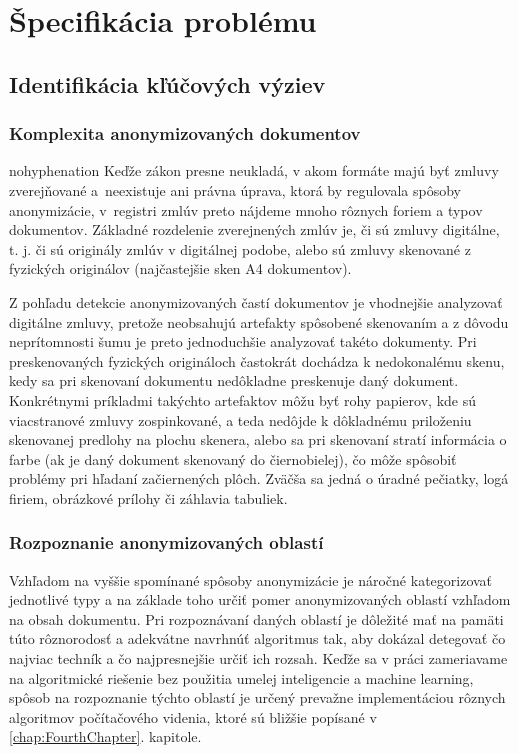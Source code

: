 \chapter{Špecifikácia problému}
\label{chap:SecondChapter}
\section{Identifikácia kľúčových výziev}
\subsection{Komplexita anonymizovaných dokumentov}
\begin{hyphenrules}{nohyphenation}
Keďže zákon \cite{ZakonyProLidi2015-340} presne neukladá, v akom formáte majú byť zmluvy zverejňované a~neexistuje ani právna úprava, ktorá by regulovala spôsoby anonymizácie, v~registri zmlúv preto nájdeme mnoho rôznych foriem a typov dokumentov.
Základné rozdelenie zverejnených zmlúv je, či sú zmluvy digitálne, t. j. či sú originály zmlúv v digitálnej podobe, alebo sú zmluvy skenované z fyzických originálov (najčastejšie sken A4 dokumentov). 
\newline 

Z pohľadu detekcie anonymizovaných častí dokumentov je vhodnejšie analyzovať digitálne zmluvy, pretože neobsahujú artefakty spôsobené skenovaním a z dôvodu neprítomnosti šumu je preto jednoduchšie analyzovať takéto dokumenty.
Pri preskenovaných fyzických origináloch častokrát dochádza k nedokonalému skenu, kedy sa pri skenovaní dokumentu nedôkladne preskenuje daný dokument. Konkrétnymi príkladmi takýchto artefaktov môžu byť rohy papierov, kde sú viacstranové zmluvy zospinkované, a teda nedôjde k 
dôkladnému priloženiu skenovanej predlohy na plochu skenera, alebo sa pri skenovaní stratí informácia o farbe (ak je daný dokument skenovaný do čiernobielej), čo môže spôsobiť problémy pri hľadaní začiernených plôch. Zväčša sa jedná o úradné pečiatky, logá firiem, obrázkové prílohy či záhlavia tabuliek.


\subsection{Rozpoznanie anonymizovaných oblastí}
Vzhľadom na vyššie spomínané spôsoby anonymizácie je náročné kategorizovať jednotlivé typy a na základe toho určiť pomer anonymizovaných oblastí vzhľadom na obsah dokumentu. Pri rozpoznávaní daných oblastí je dôležité mať na pamäti túto rôznorodosť a adekvátne navrhnúť algoritmus tak, aby dokázal detegovať čo najviac techník a čo najpresnejšie určiť ich rozsah. Keďže sa v práci zameriavame na algoritmické riešenie bez použitia umelej inteligencie a machine learning, spôsob na rozpoznanie týchto oblastí je určený prevažne implementáciou rôznych algoritmov počítačového videnia, ktoré sú bližšie popísané v \ref{chap:FourthChapter}. kapitole.


\end{hyphenrules}
